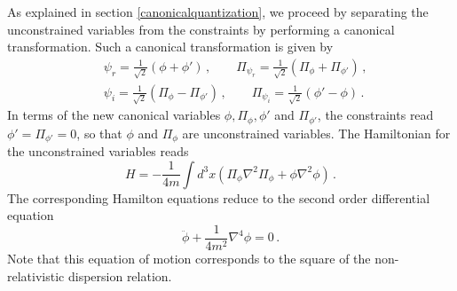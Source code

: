 \documentclass[12pt]{article}
\begin{document}
As explained in section \ref{canonicalquantization}, we proceed by separating the unconstrained variables from the constraints by performing a canonical transformation. Such a canonical transformation is given by
\begin{align}
&\psi_r = \frac{1}{\sqrt{2}} \left(\phi + \phi' \right)\,,\qquad \Pi_{\psi_r} = \frac{1}{\sqrt{2}} \left(\Pi_{\phi} + \Pi_{\phi'} \right) \,, \nonumber\\
&\psi_i = \frac{1}{\sqrt{2}} \left(\Pi_{\phi} - \Pi_{\phi'} \right) \,,\qquad \Pi_{\psi_i} = \frac{1}{\sqrt{2}} \left(\phi' - \phi \right)  \,.
\label{s.6}
\end{align}
In terms of the new canonical variables $\phi,\Pi_{\phi},\phi'$ and $\Pi_{\phi'}$, the constraints read $\phi'=\Pi_{\phi'}=0$, so that $\phi$ and $\Pi_{\phi}$ are unconstrained variables. The Hamiltonian for the unconstrained variables reads 
\begin{equation}
H=-\frac{1}{4m} \int d^3 x \left( \Pi_{\phi} \nabla^2 \Pi_{\phi} + \phi \nabla^2\phi  \right)\,.
\label{s.7}
\end{equation} 
The corresponding Hamilton equations reduce to the second order differential equation
\begin{equation}
{\ddot \phi} +  \frac{1}{4m^2}\nabla^4 \phi =0\,. 
\label{s.7.01}
\end{equation}
Note that this equation of motion corresponds to the square of the non-relativistic dispersion relation.
\end{document}
